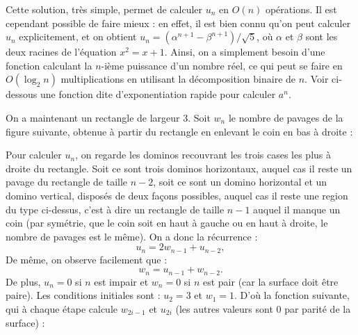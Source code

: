 Cette solution, très simple, permet de calculer $u_n$ en $O(n)$ opérations. Il est cependant possible de faire mieux : en effet, il est bien connu qu'on peut calculer $u_n$ explicitement, et on obtient $u_n=(\alpha^{n+1} - \beta^{n+1})/\sqrt{5}$, où $\alpha$ et $\beta$ sont les deux racines de l'équation $x^2=x+1$. Ainsi, on a simplement besoin d'une fonction calculant la $n$-ième puissance d'un nombre réel, ce qui peut se faire en $O(\log_2n)$ multiplications en utilisant la décomposition binaire de $n$. Voir ci-dessous une fonction dite \og d'exponentiation rapide \fg{} pour calculer $a^n$.



\Q
On a maintenant un rectangle de largeur 3. Soit $w_n$ le nombre de pavages de la figure suivante, obtenue à partir du rectangle en enlevant le coin en bas à droite :
\medskip


Pour calculer $u_n$, on regarde les dominos recouvrant les trois cases les plus à droite du rectangle. Soit ce sont trois dominos horizontaux, auquel cas il reste un pavage du rectangle de taille $n-2$, soit ce sont un domino horizontal et un domino vertical, disposés de deux façons possibles, auquel cas il reste une region du type ci-dessus, c'est à dire un rectangle de taille $n-1$ auquel il manque un coin (par symétrie, que le coin soit en haut à gauche ou en haut à droite, le nombre de pavages est le même). On a donc la récurrence :
\[
    u_n = 2w_{n-1} + u_{n-2},
\]
De même, on observe facilement que :
\[
    w_n = u_{n-1} + w_{n-2}.
\]
De plus, $u_n=0$ si $n$ est impair et $w_n=0$ si $n$ est pair (car la surface doit être paire). Les conditions initiales sont : $u_2=3$ et $w_1=1$. D'où la fonction suivante, qui à chaque étape calcule $w_{2i-1}$ et $u_{2i}$ (les autres valeurs sont 0 par parité de la surface) :

